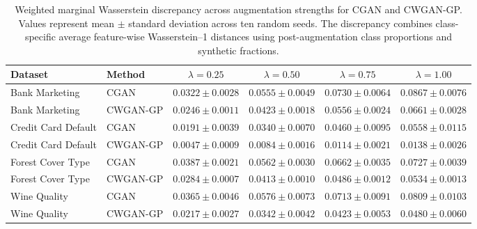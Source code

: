 \begin{table}[htbp]
\centering
\caption{Weighted marginal Wasserstein discrepancy across augmentation strengths for CGAN and CWGAN-GP. Values represent mean $\pm$ standard deviation across ten random seeds. The discrepancy combines class-specific average feature-wise Wasserstein--1 distances using post-augmentation class proportions and synthetic fractions.}
\label{tab:supp_wasserstein_sensitivity}
\small
\begin{adjustbox}{max width=\textwidth}
\begin{tabular}{llcccc}
\toprule
Dataset & Method & $\lambda=0.25$ & $\lambda=0.50$ & $\lambda=0.75$ & $\lambda=1.00$ \\
\midrule
Bank Marketing & CGAN & $0.0322\pm0.0028$ & $0.0555\pm0.0049$ & $0.0730\pm0.0064$ & $0.0867\pm0.0076$ \\
Bank Marketing & CWGAN-GP & $0.0246\pm0.0011$ & $0.0423\pm0.0018$ & $0.0556\pm0.0024$ & $0.0661\pm0.0028$ \\
\midrule
Credit Card Default & CGAN & $0.0191\pm0.0039$ & $0.0340\pm0.0070$ & $0.0460\pm0.0095$ & $0.0558\pm0.0115$ \\
Credit Card Default & CWGAN-GP & $0.0047\pm0.0009$ & $0.0084\pm0.0016$ & $0.0114\pm0.0021$ & $0.0138\pm0.0026$ \\
\midrule
Forest Cover Type & CGAN & $0.0387\pm0.0021$ & $0.0562\pm0.0030$ & $0.0662\pm0.0035$ & $0.0727\pm0.0039$ \\
Forest Cover Type & CWGAN-GP & $0.0284\pm0.0007$ & $0.0413\pm0.0010$ & $0.0486\pm0.0012$ & $0.0534\pm0.0013$ \\
\midrule
Wine Quality & CGAN & $0.0365\pm0.0046$ & $0.0576\pm0.0073$ & $0.0713\pm0.0091$ & $0.0809\pm0.0103$ \\
Wine Quality & CWGAN-GP & $0.0217\pm0.0027$ & $0.0342\pm0.0042$ & $0.0423\pm0.0053$ & $0.0480\pm0.0060$ \\
\bottomrule
\end{tabular}
\end{adjustbox}
\end{table}